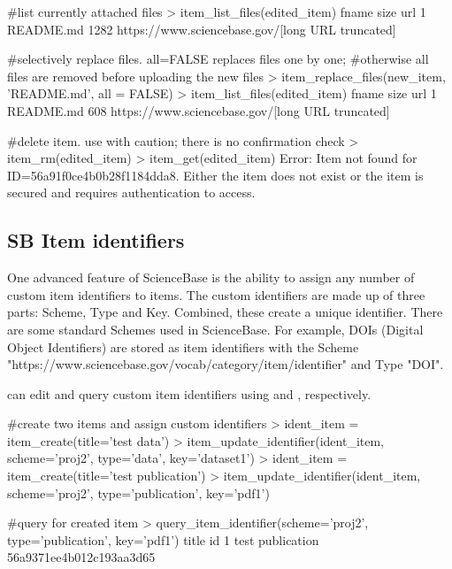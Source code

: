 \begin{example}
#list currently attached files
> item_list_files(edited_item)
      fname size     url
1 README.md 1282     https://www.sciencebase.gov/[long URL truncated]

#selectively replace files. all=FALSE replaces files one by one;
#otherwise all files are removed before uploading the new files
> item_replace_files(new_item, 'README.md', all = FALSE)
> item_list_files(edited_item)
      fname size     url
1 README.md 608     https://www.sciencebase.gov/[long URL truncated]

#delete item. use with caution; there is no confirmation check
> item_rm(edited_item)
> item_get(edited_item)
Error: Item not found for ID=56a91f0ce4b0b28f1184dda8. Either the item does
not exist or the item is secured and requires authentication to access.
\end{example}


\subsection{SB Item identifiers}
One advanced feature of ScienceBase is the ability to assign any
number of custom item identifiers to items. The custom identifiers are made up
of three parts: Scheme, Type and Key. Combined, these create a unique identifier.
There are some standard Schemes used in ScienceBase. For example, DOIs (Digital
Object Identifiers) are stored as item identifiers with the Scheme
"https://www.sciencebase.gov/vocab/category/item/identifier" and Type "DOI".

 can edit and query custom item identifiers using
 and ,
respectively.

\begin{example}
#create two items and assign custom identifiers
> ident_item = item_create(title='test data')
> item_update_identifier(ident_item, scheme='proj2', type='data', key='dataset1')
> ident_item = item_create(title='test publication')
> item_update_identifier(ident_item, scheme='proj2', type='publication', key='pdf1')

#query for created item
> query_item_identifier(scheme='proj2', type='publication', key='pdf1')
             title                       id
1 test publication 56a9371ee4b012c193aa3d65
\end{example}

